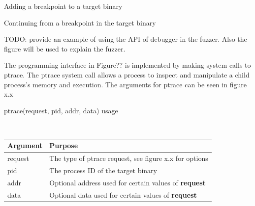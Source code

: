 \documentclass{article}
\begin{document}
\begin{algorithm}[H]
    \caption{Adding a breakpoint to a target binary}
\end{algorithm}
\begin{algorithm}[H]
    \caption{Continuing from a breakpoint in the target binary}
\end{algorithm}

TODO: provide an example of using the API of debugger in the fuzzer. Also the figure will be used to explain the fuzzer.

The programming interface in Figure?? is implemented by making system calls to ptrace. The ptrace system call allows a
process to inspect and manipulate a child process's memory and execution. The arguments for ptrace can be seen in figure
x.x

\begin{center}
    \caption{ptrace(request, pid, addr, data) usage} \\
    \begin{tabular}{|l|l|}
    \hline
    \bf Argument & \bf Purpose \\ \hline
    request & The type of ptrace request, see figure x.x for options \\ \hline
    pid & The process ID of the target binary \\ \hline
    addr & Optional address used for certain values of \bf{request} \\ \hline
    data & Optional data used for certain values of \bf{request} \\ \hline
    \end{tabular}
\end{center}
\end{document}
